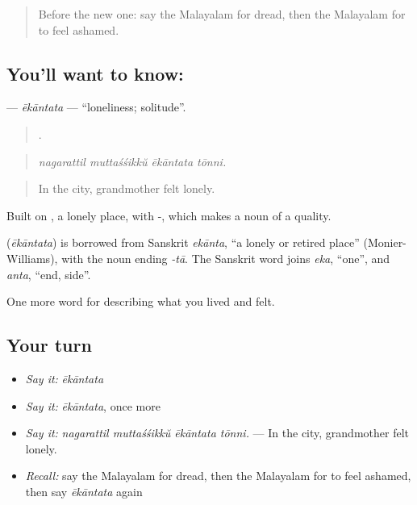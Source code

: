\label{lesson:ML-C518-ekantata}



\begin{quote}
Before the new one: say the Malayalam for dread, then the Malayalam for to feel ashamed.
\end{quote}

\subsection*{You'll want to know: }
\textbf{} — \emph{ēkāntata} — \textquotedblleft{}loneliness; solitude\textquotedblright{}.

\begin{quote}
   .
\end{quote}

\begin{quote}
\emph{nagarattil muttaśśikkŭ ēkāntata tōnni.}
\end{quote}

\begin{quote}
In the city, grandmother felt lonely.
\end{quote}

Built on , a lonely place, with -, which makes a noun of a quality.

\begin{cousinweb}
\textbf{} (\emph{ēkāntata}) is borrowed from Sanskrit \emph{ekānta}, \textquotedblleft{}a lonely or retired place\textquotedblright{} (Monier-Williams), with the noun ending \emph{-tā}. The Sanskrit word joins \emph{eka}, \textquotedblleft{}one\textquotedblright{}, and \emph{anta}, \textquotedblleft{}end, side\textquotedblright{}.
\end{cousinweb}

\begin{grammarlens}[title={What you've built}]
One more word for describing what you lived and felt.
\end{grammarlens}

\subsection*{Your turn}
\begin{itemize}
\raggedright
  \item \emph{Say it:} \emph{ēkāntata}
  \item \emph{Say it:} \emph{ēkāntata}, once more
  \item \emph{Say it:} \emph{nagarattil muttaśśikkŭ ēkāntata tōnni.} — In the city, grandmother felt lonely.
  \item \emph{Recall:} say the Malayalam for dread, then the Malayalam for to feel ashamed, then say \emph{ēkāntata} again
\end{itemize}

